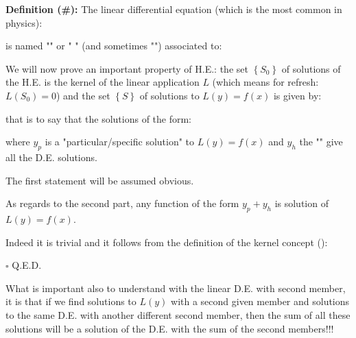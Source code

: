	\textbf{Definition (\#\mydef):} The linear differential equation (which is the most common in physics):
	
	is named "" or " " (and sometimes "") associated to:
	
	\begin{theorem}
	We will now prove an important property of H.E.: the set $\left\lbrace S_0 \right\rbrace$ of solutions of the H.E. is the kernel of the linear application $L$ (which means for refresh: $L(S_0)=0$) and the set  $\left\lbrace S \right\rbrace$ of solutions to $L(y)=f(x)$ is given by:
	
	that is to say that the solutions of the form:
	
	where $y_p$ is a "particular/specific solution" to $L(y)=f(x)$ and $y_h$ the "" give all the D.E. solutions.
	\end{theorem}
	\begin{dem}
	The first statement will be assumed obvious.
	
	As regards to the second part, any function of the form $y_p+y_h$ is solution of $L(y)=f(x)$.
	
	Indeed it is trivial and it follows from the definition of the kernel concept ():
	
	\begin{flushright}
		$\square$  Q.E.D.
	\end{flushright}
	\end{dem}
	What is important also to understand with the linear D.E. with second member, it is that if we find solutions to $L(y)$ with a second given member and solutions to the same D.E. with another different second member, then the sum of all these solutions will be a solution of the D.E. with the sum of the second members!!!\label{sum solutions of differential equations}
	
